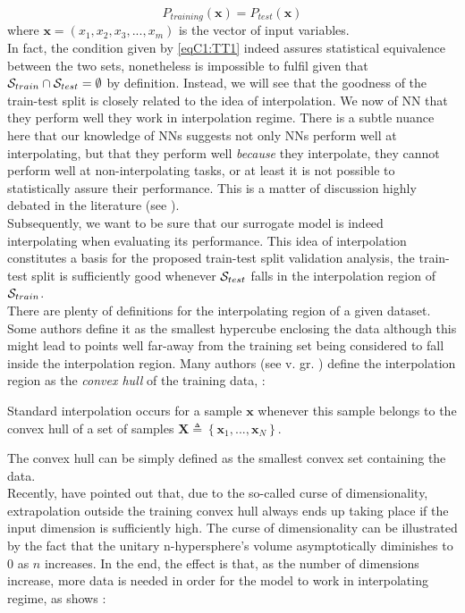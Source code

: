\begin{equation} \label{eqC1:TT1}
	P_{training}(\mathbf{x})=P_{test}(\mathbf{x})
\end{equation}
where $\mathbf{x}=(x_1, x_2, x_3,...,x_m)$ is the vector of input variables.\\
%
\indent In fact, the condition given by \eqref{eqC1:TT1} indeed assures statistical equivalence between the two sets, nonetheless is impossible to fulfil given that ${\cal S}_{train} \cap {\cal S}_{test} = \emptyset$ by definition. Instead, we will see that the goodness of the train-test split is closely related to the idea of interpolation. We now of NN that they perform well they work in interpolation regime. There is a subtle nuance here that our knowledge of NNs suggests not only NNs perform well at interpolating, but that they perform well \textit {because} they interpolate, \ie they cannot perform well at non-interpolating tasks, or at least it is not possible to statistically assure their performance. This is a matter of discussion highly debated in the literature (see \eg \cite{pmlr-v80-barrett18a,DBLP:journals/corr/abs-1711-00350,DBLP:journals/corr/abs-1904-01557}).\\ 
%
\indent Subsequently, we want to be sure that our surrogate model is indeed interpolating when evaluating its performance. This idea of interpolation constitutes a basis for the proposed train-test split validation analysis, \ie the train-test split is sufficiently good whenever ${\cal S}_{test}$ falls in the interpolation region of ${\cal S}_{train}$.\\
%
\indent There are plenty of definitions for the interpolating region of a given dataset. Some authors define it as the smallest hypercube enclosing the data\cite{ebert2014interpolation} although this might lead to points well far-away from the training set being considered to fall inside the interpolation region. Many authors (see v. gr. \cite{loh2007extrapolation,4505337}) define the interpolation region as the \textit{convex hull} of the training data, \ie:

\begin{definition}\cite{balestriero2021learning}\label{def:interpolacion}
	Standard interpolation occurs for a sample $\mathbf{x}$ whenever this sample belongs to the convex hull of a set of samples $\mathbf{X}\triangleq \left\{\mathbf{x}_1,...,\mathbf{x}_N\right\}$.
\end{definition}

The convex hull can be simply defined as the smallest convex set containing the data\cite{Preparata1985}.\\
%
\indent Recently, \cite{balestriero2021learning} have pointed out that, due to the so-called curse of dimensionality, extrapolation outside the training convex hull always ends up taking place if the input dimension is sufficiently high. The curse of dimensionality\cite[pp. 17-18]{Marsland2015Machine} can be illustrated by the fact that the unitary n-hypersphere's volume asymptotically diminishes to $0$ as $n$ increases. In the end, the effect is that, as the number of dimensions increase, more data is needed in order for the model to work in interpolating regime, as shows :\\

